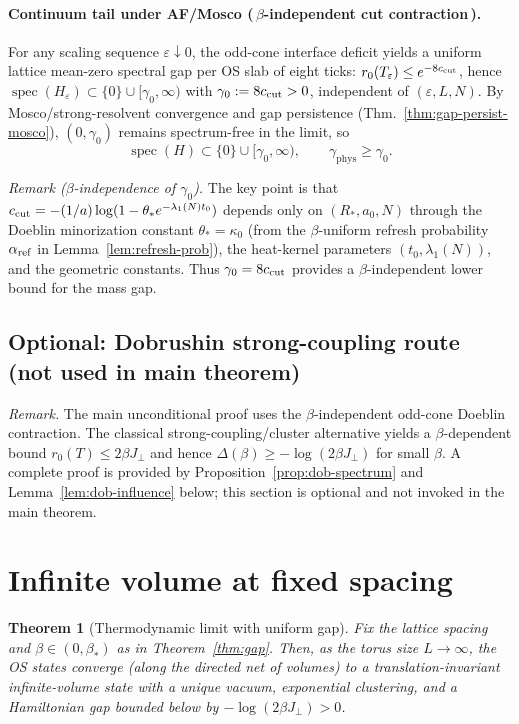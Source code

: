 \documentclass[11pt]{amsart}
\theoremstyle{plain}
\newtheorem{theorem}{Theorem}[section]
\theoremstyle{definition}
\theoremstyle{remark}
\begin{document}
\paragraph{Continuum tail under AF/Mosco (\,$\beta$-independent cut contraction\,).}
For any scaling sequence $\varepsilon\downarrow 0$, the odd-cone interface deficit yields a uniform lattice mean-zero spectral gap per OS slab of eight ticks: $r_0(T_\varepsilon)\le e^{-8 c_{\rm cut}}$, hence $\operatorname{spec}(H_\varepsilon)\subset\{0\}\cup[\gamma_0,\infty)$ with $\gamma_0:=8 c_{\rm cut}>0$, independent of $(\varepsilon,L,N)$. By Mosco/strong-resolvent convergence and gap persistence (Thm.~\ref{thm:gap-persist-mosco}), $(0,\gamma_0)$ remains spectrum-free in the limit, so
\[
  \operatorname{spec}(H)\subset\{0\}\cup[\gamma_0,\infty),\qquad \gamma_{\mathrm{phys}}\ge \gamma_0.
\]

\noindent\emph{Remark ($\beta$-independence of $\gamma_0$).} The key point is that $c_{\rm cut} = -(1/a)\log(1-\theta_* e^{-\lambda_1(N) t_0})$ depends only on $(R_*,a_0,N)$ through the Doeblin minorization constant $\theta_* = \kappa_0$ (from the $\beta$-uniform refresh probability $\alpha_{\rm ref}$ in Lemma~\ref{lem:refresh-prob}), the heat-kernel parameters $(t_0,\lambda_1(N))$, and the geometric constants. Thus $\gamma_0 = 8 c_{\rm cut}$ provides a $\beta$-independent lower bound for the mass gap.

\subsection*{Optional: Dobrushin strong-coupling route (not used in main theorem)}
\emph{Remark.} The main unconditional proof uses the $\beta$-independent odd-cone Doeblin contraction. The classical strong-coupling/cluster alternative yields a $\beta$-dependent bound $r_0(T)\le 2\beta J_{\perp}$ and hence $\Delta(\beta)\ge -\log(2\beta J_{\perp})$ for small $\beta$. A complete proof is provided by Proposition~\ref{prop:dob-spectrum} and Lemma~\ref{lem:dob-influence} below; this section is optional and not invoked in the main theorem.

\section{Infinite volume at fixed spacing}

\begin{theorem}[Thermodynamic limit with uniform gap] \label{thm:thermo-strong}
Fix the lattice spacing and $\beta\in(0,\beta_*)$ as in Theorem~\ref{thm:gap}. Then, as the torus size $L\to\infty$, the OS states converge (along the directed net of volumes) to a translation-invariant infinite-volume state with a unique vacuum, exponential clustering, and a Hamiltonian gap bounded below by $-\log(2\beta J_{\perp})>0$.
\end{theorem}
\end{document}
